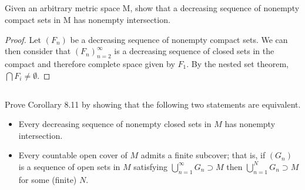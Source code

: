 \subsection{} Given an arbitrary metric space M, show that a decreasing sequence of nonempty compact sets in M has nonempty intersection.

\begin{proof}
Let $(F_n)$ be a decreasing sequence of nonempty compact sets. We can then consider that $(F_n)_{n=2}^\infty$ is a decreasing sequence of closed sets in the compact and therefore complete space given by $F_1$. By the nested set theorem, $\bigcap F_i \neq \emptyset$.
\end{proof}

\subsection{} Prove Corollary 8.11 by showing  that the following two statements are equivalent. 

\begin{itemize}
    \item Every decreasing  sequence of nonempty  closed sets  in $M$ has nonempty intersection.
    \item Every countable open cover of $M$ admits a finite subcover; that is, if $(G_n)$ is a sequence of open sets in $M$ satisfying $\bigcup_{n=1}^\infty G_n \supset M$ then  $\bigcup_{n=1}^N G_n \supset M$ for some (finite) $N$.
\end{itemize}

